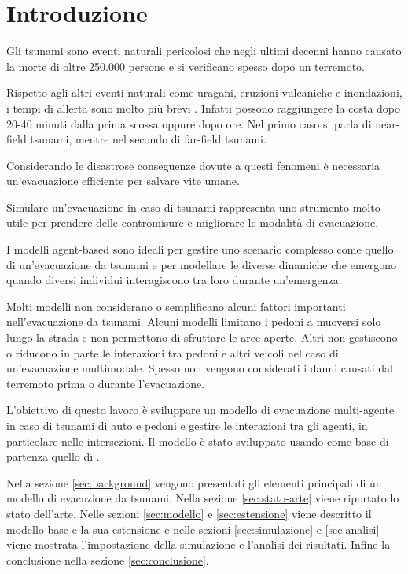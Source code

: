 \section{Introduzione}
Gli tsunami sono eventi naturali pericolosi che negli ultimi decenni 
hanno causato la morte di oltre 250.000 persone e si verificano spesso 
dopo un terremoto.

Rispetto agli altri eventi naturali come uragani, eruzioni vulcaniche e inondazioni, 
i tempi di allerta sono molto più brevi \parencite{katada2006integrated}.
%
Infatti possono raggiungere la costa dopo 20-40 minuti dalla prima scossa oppure dopo ore.
Nel primo caso si parla di near-field tsunami, mentre nel secondo di far-field tsunami. 

Considerando le disastrose conseguenze dovute a questi fenomeni è necessaria un'evacuazione efficiente per salvare vite umane. 

Simulare un'evacuazione in caso di tsunami rappresenta uno strumento molto utile per 
prendere delle contromisure e migliorare le modalità di evacuazione.

I modelli agent-based sono ideali per gestire uno scenario complesso come quello di un'evacuazione da tsunami e
per modellare le diverse dinamiche che emergono quando diversi individui interagiscono tra loro durante un'emergenza. 

Molti modelli non considerano o semplificano alcuni fattori importanti nell'evacuazione da tsunami.
Alcuni modelli limitano i pedoni a muoversi solo lungo la strada e non permettono di sfruttare le aree aperte. 
Altri non gestiscono o riducono in parte le interazioni tra pedoni e altri veicoli nel caso di un'evacuazione multimodale.
%
Spesso non vengono considerati i danni causati dal terremoto prima o durante l'evacuazione.

L'obiettivo di questo lavoro è sviluppare un modello di evacuazione multi-agente in caso di tsunami
di auto e pedoni e gestire le interazioni tra gli agenti, 
in particolare nelle intersezioni.
%
Il modello è stato sviluppato usando come base di partenza quello di \textcite{mostafizi2019agent}.

Nella sezione \ref{sec:background} vengono presentati gli elementi principali di un modello di evacuzione da tsunami.
Nella sezione \ref{sec:stato-arte} viene riportato lo stato dell'arte.
%
Nelle sezioni \ref{sec:modello} e \ref{sec:estensione} viene descritto il modello base e la sua estensione e 
nelle sezioni \ref{sec:simulazione} e \ref{sec:analisi} viene mostrata l'impostazione della simulazione e 
l'analisi dei risultati.
%
Infine la conclusione nella sezione \ref{sec:conclusione}.

\pagebreak
